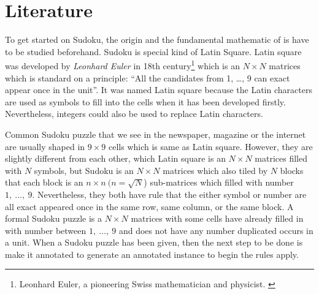 \documentclass[11pt]{report}
\begin{document}
\section{Literature}
\label{sec:introLiterature}

To get started on Sudoku, the origin and the fundamental mathematic of is have to be studied beforehand. Sudoku is special kind of Latin Square\cite{website:LatinSquare}. Latin square was developed by \emph{Leonhard Euler} in 18th century\footnote{Leonhard Euler, a pioneering Swiss mathematician and physicist. \cite{WikiLeonhardEuler}} which is an $N \times N$ matrices which is standard on a principle: ``All the candidates from 1, \dots , 9 can exact appear once in the unit''. It was named Latin square because the Latin characters are used as symbols to fill into the cells\cite{Delahay2006Science} when it has been developed firstly. Nevertheless, integers could also be used to replace Latin characters.

Common Sudoku puzzle that we see in the newspaper, magazine or the internet are usually shaped in $9 \times 9$ cells which is same as Latin square. However, they are slightly different from each other, which Latin square is an $N \times N$ matrices filled with $N$ symbols, but Sudoku is an  $N \times N$ matrices which also tiled by $N$ blocks that each block is an $n \times n \ (n = \sqrt{N}$) sub-matrices which filled with number $1,\ \dots ,\ 9$. Nevertheless, they both have rule that the either symbol or number are all exact appeared once in the same row, same column, or the same block. A formal Sudoku puzzle is a $N \times N$ matrices with some cells have already filled in with number between $1,\ \dots ,\ 9$ and does not have any number duplicated occurs in a unit. When a Sudoku puzzle has been given, then the next step to be done is make it annotated to generate an annotated instance to begin the rules apply.
\end{document}
